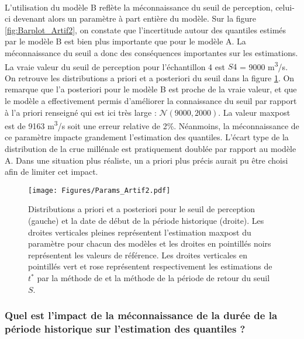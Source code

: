 \documentclass[11pt]{article}
\begin{document}
	\paragraph{} L'utilisation du modèle B reflète la méconnaissance du seuil de perception, celui-ci devenant alors un paramètre à part entière du modèle. Sur la figure \ref{fig:Barplot_Artif2}, on constate que l'incertitude autour des quantiles estimés par le modèle B est bien plus importante que pour le modèle A. La méconnaissance du seuil a donc des conséquences importantes sur les estimations. La vraie valeur du seuil de perception pour l'échantillon 4 est $S4$ = 9000 m\textsuperscript{3}/s. On retrouve les distributions a priori et a posteriori du seuil dans la figure \ref{fig:Params_Artif2}. On remarque que l'a posteriori pour le modèle B est proche de la vraie valeur, et que le modèle a effectivement permis d'améliorer la connaissance du seuil par rapport à l'a priori renseigné qui est ici très large : $\mathcal{N}(9000,2000)$. La valeur maxpost est de 9163 m\textsuperscript{3}/s soit une erreur relative de 2\%. Néanmoins, la méconnaissance de ce paramètre impacte grandement l'estimation des quantiles. L'écart type de la distribution de la crue millénale est pratiquement doublée par rapport au modèle A. Dans une situation plus réaliste, un a priori plus précis aurait pu être choisi afin de limiter cet impact. 
	
	 \begin{figure}[h]
		\centering
		\texttt{[image: Figures/Params\_Artif2.pdf]}	
		\caption{Distributions a priori et a posteriori pour le seuil de perception (gauche) et la date de début de la période historique (droite). Les droites verticales pleines représentent l'estimation maxpost du paramètre pour chacun des modèles et les droites en pointillés noirs représentent les valeurs de référence. Les droites verticales en pointillés vert et rose représentent respectivement les estimations de $t^{*}$ par la méthode de \citet{prosdocimi_german_2018} et la méthode de la période de retour du seuil $S$.}
		\label{fig:Params_Artif2}
	\end{figure}
	
	\subsubsection{Quel est l'impact de la méconnaissance de la durée de la période historique sur l'estimation des quantiles ?}	
	
\end{document}
